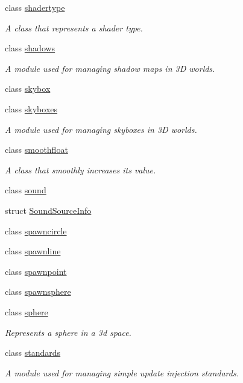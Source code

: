 \begin{DoxyCompactItemize}
class \hyperlink{classflounder_1_1shadertype}{shadertype}
\begin{DoxyCompactList}\small\item\em A class that represents a shader type. \end{DoxyCompactList}\item 
class \hyperlink{classflounder_1_1shadows}{shadows}
\begin{DoxyCompactList}\small\item\em A module used for managing shadow maps in 3D worlds. \end{DoxyCompactList}\item 
class \hyperlink{classflounder_1_1skybox}{skybox}
\item 
class \hyperlink{classflounder_1_1skyboxes}{skyboxes}
\begin{DoxyCompactList}\small\item\em A module used for managing skyboxes in 3D worlds. \end{DoxyCompactList}\item 
class \hyperlink{classflounder_1_1smoothfloat}{smoothfloat}
\begin{DoxyCompactList}\small\item\em A class that smoothly increases its value. \end{DoxyCompactList}\item 
class \hyperlink{classflounder_1_1sound}{sound}
\item 
struct \hyperlink{structflounder_1_1_sound_source_info}{Sound\+Source\+Info}
\item 
class \hyperlink{classflounder_1_1spawncircle}{spawncircle}
\item 
class \hyperlink{classflounder_1_1spawnline}{spawnline}
\item 
class \hyperlink{classflounder_1_1spawnpoint}{spawnpoint}
\item 
class \hyperlink{classflounder_1_1spawnsphere}{spawnsphere}
\item 
class \hyperlink{classflounder_1_1sphere}{sphere}
\begin{DoxyCompactList}\small\item\em Represents a sphere in a 3d space. \end{DoxyCompactList}\item 
class \hyperlink{classflounder_1_1standards}{standards}
\begin{DoxyCompactList}\small\item\em A module used for managing simple update injection standards. \end{DoxyCompactList}\item 

\end{DoxyCompactItemize}
